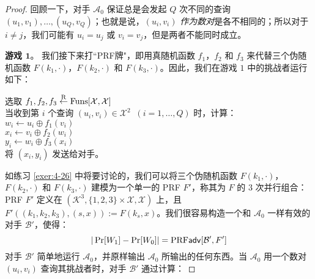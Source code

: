 \begin{proof}
\vspace{5pt}

\noindent
回顾一下，对手 $\mathcal{A}_0$ 保证总是会发起 $Q$ 次不同的查询 $(u_1,v_1),\dots,(u_Q,v_Q)$；也就是说，$(u_i,v_i)$ \emph{作为数对}是各不相同的；所以对于 $i\neq j$，我们可能有 $u_i=u_j$ 或 $v_i=v_j$，但是两者不能同时成立。

\vspace{5pt}

\noindent
\textbf{游戏 $\mathbf{1}$}。
我们接下来打``PRF牌"，即用真随机函数 $f_1$，$f_2$ 和 $f_3$ 来代替三个伪随机函数 $F(k_1,\cdot)$，$F(k_2,\cdot)$ 和 $F(k_3,\cdot)$。因此，我们在游戏 $1$ 中的挑战者运行如下：

\vspace{5pt}

\hspace*{5pt} 选取 $f_1,f_2,f_3\overset{\rm R}\leftarrow{\rm Funs}[\mathcal{X},\mathcal{X}]$\\
\hspace*{26pt} 当收到第 $i$ 个查询 $(u_i,v_i)\in\mathcal{X}^2\;\;(i=1,\dots,Q)$ 时，计算：\\
\hspace*{50pt} $w_i\leftarrow u_i\oplus f_1(v_i)$\\
\hspace*{50pt} $x_i\leftarrow v_i\oplus f_2(w_i)$\\
\hspace*{50pt} $y_i\leftarrow w_i\oplus f_3(x_i)$\\
\hspace*{50pt} 将 $(x_i,y_i)$ 发送给对手。

\vspace{5pt}

如练习 \ref{exer:4-26} 中将要讨论的，我们可以将三个伪随机函数 $F(k_1,\cdot)$，$F(k_2,\cdot)$ 和 $F(k_3,\cdot)$ 建模为一个单一的 PRF $F'$，称其为 $F$ 的 $3$ 次并行组合：PRF $F'$ 定义在 $(\mathcal{K}^3,\{1,2,3\}\times\mathcal{X},\mathcal{X})$ 上，且 $F'((k_1,k_2,k_3),(s,x)):=F(k_s,x)$。我们很容易构造一个和 $\mathcal{A}_0$ 一样有效的对手 $\mathcal{B}'$，使得：
\begin{equation}\label{eq:4-24}
|\Pr[W_1]-\Pr[W_0]|={\rm PRF\mathsf{adv}}[\mathcal{B}', F']
\end{equation}
对手 $\mathcal{B}'$ 简单地运行 $\mathcal{A}_0$，并原样输出 $\mathcal{A}_0$ 所输出的任何东西。当 $\mathcal{A}_0$ 用一个数对 $(u_i,v_i)$ 查询其挑战者时，对手 $\mathcal{B}'$ 通过计算：

\vspace{5pt}


\end{proof}
